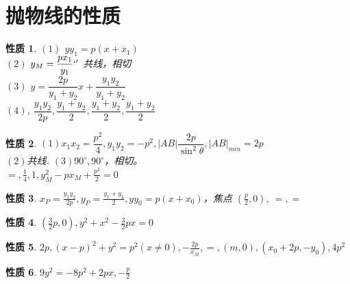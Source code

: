 \documentclass[a4paper,10pt,twoside]{article}
\newtheorem{proposition}{性质}
\begin{document}
\section{抛物线的性质}
\begin{proposition}
     $ (1)  $  $ yy_1=p(x+x_1) $ \\
      $ (2) $  $ y_M=\dfrac{px_1 }{y_1 }`' $ 共线，相切\\
       $ (3)  $  $ y=\dfrac{2p }{y_1+y_2 }x +\dfrac{y_1y_2 }{y_1+y_2 } $ \\
        $ (4)  $, $ \dfrac{y_1y_2 }{2p } ,\dfrac{y_1+y_2 }{2},\dfrac{y_1+y_2 }{2 },\dfrac{y_1+y_2 }{2}$ 
\end{proposition}
\begin{proposition}
     $ (1)x_1x_2=\dfrac{p^2 }{4},y_1y_2=-p^2,|AB|\dfrac{2p }{\sin ^2\theta },|AB|_{min}=2p    $\\
      $ (2)  $共线. $ (3)90^{\circ},90^{\circ} $，相切。\\
       $ =,\frac{1 }{4 },1,y_M^2-px_M+\frac{p^2 }{2 }=0 $  
\end{proposition}
\begin{proposition}
     $ x_P=\frac{y_1y_2}{2p },y_P =\frac{y_1+y_2}{2},yy_0=p(x+x_0) $，焦点 $ (\frac{p }{2 },0) $, $ =,= $   
\end{proposition}
\begin{proposition}
     $ (\frac{3 }{2 }p,0 ),y^2+x^2-\frac{3 }{2 }px=0$ 
\end{proposition}
\begin{proposition}
     $ 2p,(x-p)^2+y^2=p^2(x\not=0),-\frac{2p }{x_M  },=,(m,0),(x_0+2p,-y_0),4p^2 $ 
\end{proposition}
\begin{proposition}
     $ 9y^2=-8p^2+2px,-\frac{p }{2} $ 
\end{proposition}
\end{document}
